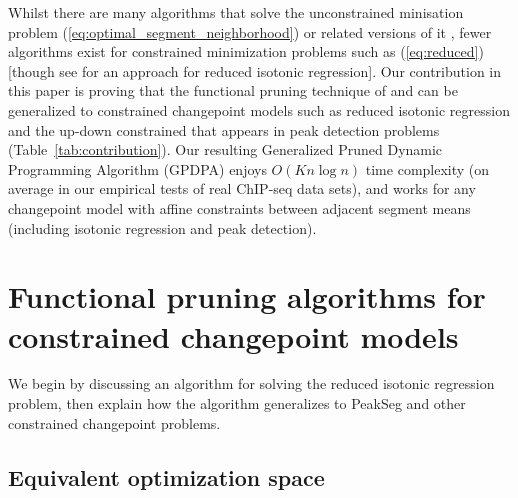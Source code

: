 \documentclass[aoas]{imsart}
\begin{document}
Whilst there are many algorithms that solve the unconstrained
minisation problem (\ref{eq:optimal_segment_neighborhood})
\citep{segment-neighborhood,pruned-dp,phd-johnson} or related versions
of it \citep{optimal-partitioning,pelt,fpop,flsa}, fewer algorithms
exist for constrained minimization problems such as (\ref{eq:reduced})
[though see \citet{hardwick2014optimal} for an approach
for reduced isotonic regression]. Our contribution in this paper is
proving that the functional pruning technique of \citet{pruned-dp} and
\citet{fpop} can be generalized to constrained changepoint models such
as reduced isotonic regression and the up-down constrained that
appears in peak detection problems (Table~\ref{tab:contribution}). Our
resulting Generalized Pruned Dynamic Programming Algorithm (GPDPA)
enjoys $O(Kn\log n)$ time complexity (on average in our empirical
tests of real ChIP-seq data sets), and works for any changepoint model
with affine constraints between adjacent segment means (including
isotonic regression and peak detection).

\newcommand{\FCC}{C}
\newcommand{\M}{\mathcal{M}}
\section{Functional 
pruning algorithms for constrained
  changepoint models}
\label{sec:algorithms}



We begin by discussing an algorithm for solving the reduced isotonic
regression problem, then explain how the algorithm generalizes to
PeakSeg and other constrained changepoint problems.

\subsection{Equivalent optimization space}
\end{document}
